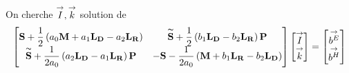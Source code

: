   \begin{prop}
    \label{prop:form_int:ci3}
    On cherche \({\overset{\rightarrow}{I}},{\overset{\rightarrow}{k}}\) solution de
    \begin{equation*}
      \begin{bmatrix}
        \mathbf{S} +  \dfrac{1}{2} \left(a_0 \mathbf{M} + a_1 \mathbf{L_D} - a_2 \mathbf{L_R}\right) & \mathbf{\overset{\thicksim}{S}} + \dfrac{1}{2}\left(b_1 \mathbf{L_D} - b_2 \mathbf{L_R} \right)\mathbf{P} \\
        \mathbf{\overset{\thicksim}{S}} + \dfrac{1}{2a_0}\left( a_2 \mathbf{L_D} - a_1 \mathbf{L_R} \right)\mathbf{P} & -\mathbf{S} - \dfrac{1}{2a_0}\left(\mathbf{M} + b_1 \mathbf{L_R} - b_2 \mathbf{L_D} \right)
      \end{bmatrix}
      \begin{bmatrix}
        {\overset{\rightarrow}{I}}\\
        {\overset{\rightarrow}{k}}
      \end{bmatrix}
      =
      \begin{bmatrix}
        {\overset{\rightarrow}{b^E}}\\
        {\overset{\rightarrow}{b^H}}
      \end{bmatrix}
    \end{equation*}
  \end{prop}
